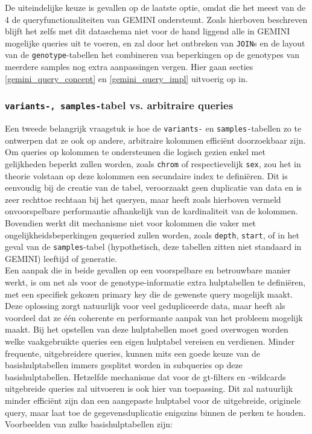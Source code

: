 De uiteindelijke keuze is gevallen op de laatste optie, omdat die het meest van de 4 de queryfunctionaliteiten van GEMINI ondersteunt. Zoals hierboven beschreven blijft het zelfs met dit dataschema niet voor de hand liggend alle in GEMINI mogelijke queries uit te voeren, en zal door het ontbreken van \texttt{JOIN}s en de layout van de \texttt{genotype}-tabellen het combineren van beperkingen op de genotypes van meerdere samples nog extra aanpassingen vergen. Hier gaan secties \ref{gemini_query_concept} en \ref{gemini_query_impl} uitvoerig op in.

\subsubsection{\texttt{variants-, samples-}tabel vs. arbitraire queries}
\label{arbitraire_queries}

Een tweede belangrijk vraagstuk is hoe de \texttt{variants-} en \texttt{samples-}tabellen zo te ontwerpen dat ze ook op andere, arbitraire kolommen effici\"ent doorzoekbaar zijn.\\
Om queries op kolommen te ondersteunen die logisch gezien enkel met gelijkheden beperkt zullen worden, zoals \texttt{chrom} of respectievelijk \texttt{sex}, zou het in theorie volstaan op deze kolommen een secundaire index te defini\"eren. Dit is eenvoudig bij de creatie van de tabel, veroorzaakt geen duplicatie van data en is zeer rechttoe rechtaan bij het queryen, maar heeft zoals hierboven vermeld onvoorspelbare performantie afhankelijk van de kardinaliteit van de kolommen. Bovendien werkt dit mechanisme niet voor kolommen die vaker met ongelijkheidsbeperkingen gequeried zullen worden, zoals \texttt{depth}, \texttt{start}, of in het geval van de \texttt{samples}-tabel (hypothetisch, deze tabellen zitten niet standaard in GEMINI) leeftijd of generatie.\\

Een aanpak die in beide gevallen op een voorspelbare en betrouwbare manier werkt, is om net als voor de genotype-informatie extra hulptabellen te defini\"eren, met een specifiek gekozen primary key die de gewenste query mogelijk maakt. Deze oplossing zorgt natuurlijk voor veel gedupliceerde data, maar heeft als voordeel dat ze \'e\'en coherente en performante aanpak van het probleem mogelijk maakt. Bij het opstellen van deze hulptabellen moet goed overwogen worden welke vaakgebruikte queries een eigen hulptabel vereisen en verdienen. Minder frequente, uitgebreidere queries, kunnen mits een goede keuze van de basishulptabellen immers gesplitst worden in subqueries op deze basishulptabellen. Hetzelfde mechanisme dat voor de gt-filters en -wildcards uitgebreide queries zal uitvoeren is ook hier van toepassing. Dit zal natuurlijk minder effici\"ent zijn dan een aangepaste hulptabel voor de uitgebreide, originele query, maar laat toe de gegevensduplicatie enigszins binnen de perken te houden. Voorbeelden van zulke basishulptabellen zijn:

